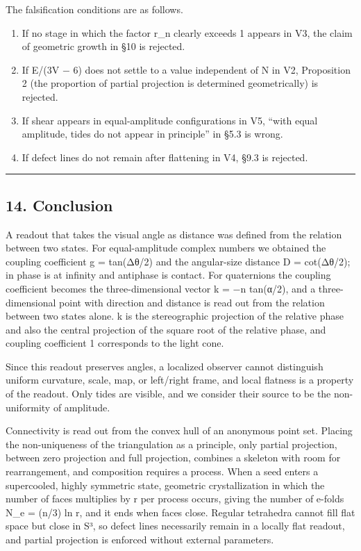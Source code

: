 \documentclass[
  a4paper,
]{article}
\providecommand{\tightlist}{%
  \setlength{\itemsep}{0pt}\setlength{\parskip}{0pt}}
\begin{document}
The falsification conditions are as follows.

\begin{enumerate}
\def\labelenumi{\arabic{enumi}.}
\tightlist
\item
  If no stage in which the factor r\_n clearly exceeds 1 appears in V3,
  the claim of geometric growth in §10 is rejected.
\item
  If E/(3V − 6) does not settle to a value independent of N in V2,
  Proposition 2 (the proportion of partial projection is determined
  geometrically) is rejected.
\item
  If shear appears in equal-amplitude configurations in V5, ``with equal
  amplitude, tides do not appear in principle'' in §5.3 is wrong.
\item
  If defect lines do not remain after flattening in V4, §9.3 is
  rejected.
\end{enumerate}

\begin{center}\rule{0.5\linewidth}{0.5pt}\end{center}

\subsection{14. Conclusion}\label{conclusion}

A readout that takes the visual angle as distance was defined from the
relation between two states. For equal-amplitude complex numbers we
obtained the coupling coefficient g = tan(Δθ/2) and the angular-size
distance D = cot(Δθ/2); in phase is at infinity and antiphase is
contact. For quaternions the coupling coefficient becomes the
three-dimensional vector k = −n tan(α/2), and a three-dimensional point
with direction and distance is read out from the relation between two
states alone. k is the stereographic projection of the relative phase
and also the central projection of the square root of the relative
phase, and coupling coefficient 1 corresponds to the light cone.

Since this readout preserves angles, a localized observer cannot
distinguish uniform curvature, scale, map, or left/right frame, and
local flatness is a property of the readout. Only tides are visible, and
we consider their source to be the non-uniformity of amplitude.

Connectivity is read out from the convex hull of an anonymous point set.
Placing the non-uniqueness of the triangulation as a principle, only
partial projection, between zero projection and full projection,
combines a skeleton with room for rearrangement, and composition
requires a process. When a seed enters a supercooled, highly symmetric
state, geometric crystallization in which the number of faces multiplies
by r per process occurs, giving the number of e-folds N\_e = (n/3) ln r,
and it ends when faces close. Regular tetrahedra cannot fill flat space
but close in S³, so defect lines necessarily remain in a locally flat
readout, and partial projection is enforced without external parameters.
\end{document}
